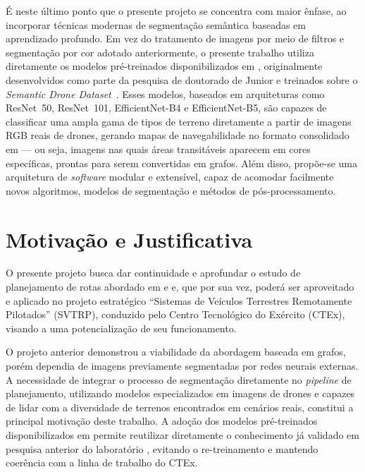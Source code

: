 \documentclass[
    12pt,
    openright,
    oneside,
    a4paper,
    english,
    brazil
]{abntex2}
\begin{document}
É neste último ponto que o presente projeto se concentra com maior ênfase, ao incorporar técnicas modernas de segmentação semântica baseadas em aprendizado profundo. Em vez do tratamento de imagens por meio de filtros e segmentação por cor adotado anteriormente, o presente trabalho utiliza diretamente os modelos pré-treinados disponibilizados em \cite{junior2024_models}, originalmente desenvolvidos como parte da pesquisa de doutorado de Junior \cite{junior2024} e treinados sobre o \emph{Semantic Drone Dataset}~\cite{drone_dataset}. Esses modelos, baseados em arquiteturas como ResNet~50, ResNet~101, EfficientNet-B4 e EfficientNet-B5, são capazes de classificar uma ampla gama de tipos de terreno diretamente a partir de imagens RGB reais de drones, gerando mapas de navegabilidade no formato consolidado em \cite{junior2025_rrt} --- ou seja, imagens nas quais áreas transitáveis aparecem em cores específicas, prontas para serem convertidas em grafos. Além disso, propõe-se uma arquitetura de \textit{software} modular e extensível, capaz de acomodar facilmente novos algoritmos, modelos de segmentação e métodos de pós-processamento.

\section{Motivação e Justificativa}

O presente projeto busca dar continuidade e aprofundar o estudo de planejamento de rotas abordado em \cite{camelo2025} e \cite{junior2024} e, que por sua vez, poderá ser aproveitado e aplicado no projeto estratégico ``Sistemas de Veículos Terrestres Remotamente Pilotados'' (SVTRP), conduzido pelo Centro Tecnológico do Exército (CTEx), visando a uma potencialização de seu funcionamento.

O projeto anterior demonstrou a viabilidade da abordagem baseada em grafos, porém dependia de imagens previamente segmentadas por redes neurais externas. A necessidade de integrar o processo de segmentação diretamente no \textit{pipeline} de planejamento, utilizando modelos especializados em imagens de drones e capazes de lidar com a diversidade de terrenos encontrados em cenários reais, constitui a principal motivação deste trabalho. A adoção dos modelos pré-treinados disponibilizados em \cite{junior2024_models} permite reutilizar diretamente o conhecimento já validado em pesquisa anterior do laboratório \cite{junior2024}, evitando o re-treinamento e mantendo coerência com a linha de trabalho do CTEx.
\end{document}
